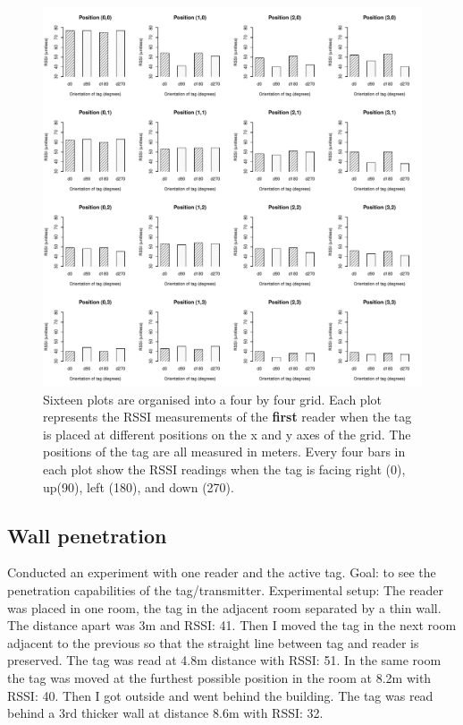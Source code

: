 \begin{figure}[H]
	\begin{center}
		\includegraphics[width=1\textwidth]{figures/rssi_distance_grid_r1}
		\caption{Sixteen plots are organised into a four by four grid. Each plot represents the RSSI measurements of the \textbf{first} reader when the tag is placed at different positions on the x and y axes of the grid. The positions of the tag are all measured in meters. Every four bars in each plot show the RSSI readings when the tag is facing right (0\textdegree), up(90\textdegree), left (180\textdegree), and down (270\textdegree).}
	\end{center}
\end{figure}


\subsection{Wall penetration}

Conducted an experiment with one reader and the active tag. Goal: to see the penetration capabilities of the tag/transmitter. Experimental setup: The reader was placed in one room, the tag in the adjacent room separated by a thin wall. The distance apart was 3m and RSSI: 41. Then I moved the tag in the next room adjacent to the previous so that the straight line between tag and reader is preserved. The tag was read at 4.8m distance with RSSI: 51. In the same room the tag was moved at the furthest possible position in the room at 8.2m with RSSI: 40. Then I got outside and went behind the building. The tag was read behind a 3rd thicker wall at distance 8.6m with RSSI: 32.

